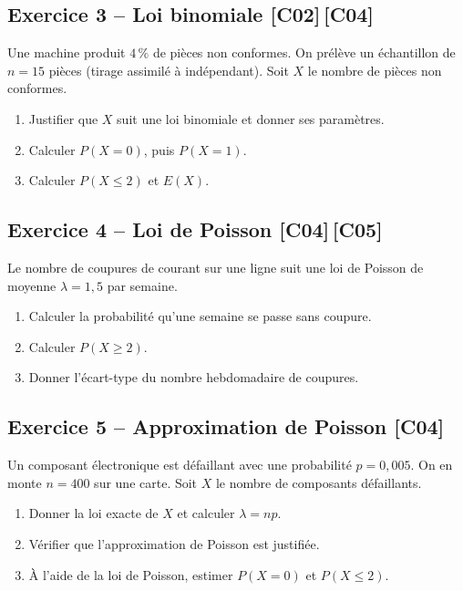 \documentclass[a4paper,11pt]{article}
\begin{document}
\subsection*{Exercice 3 -- Loi binomiale \hfill {\normalsize\color{uimmred}[C02]\,[C04]}}
Une machine produit $4\,\%$ de pièces non conformes. On prélève un échantillon de $n = 15$ pièces (tirage assimilé à indépendant). Soit $X$ le nombre de pièces non conformes.
\begin{enumerate}[label=\alph*)]
  \item Justifier que $X$ suit une loi binomiale et donner ses paramètres.
  \item Calculer $P(X = 0)$, puis $P(X = 1)$.
  \item Calculer $P(X \leq 2)$ et $E(X)$.
\end{enumerate}

\subsection*{Exercice 4 -- Loi de Poisson \hfill {\normalsize\color{uimmred}[C04]\,[C05]}}
Le nombre de coupures de courant sur une ligne suit une loi de Poisson de moyenne $\lambda = 1{,}5$ par semaine.
\begin{enumerate}[label=\alph*)]
  \item Calculer la probabilité qu'une semaine se passe sans coupure.
  \item Calculer $P(X \geq 2)$.
  \item Donner l'écart-type du nombre hebdomadaire de coupures.
\end{enumerate}

\subsection*{Exercice 5 -- Approximation de Poisson \hfill {\normalsize\color{uimmred}[C04]}}
Un composant électronique est défaillant avec une probabilité $p = 0{,}005$. On en monte $n = 400$ sur une carte. Soit $X$ le nombre de composants défaillants.
\begin{enumerate}[label=\alph*)]
  \item Donner la loi exacte de $X$ et calculer $\lambda = np$.
  \item Vérifier que l'approximation de Poisson est justifiée.
  \item À l'aide de la loi de Poisson, estimer $P(X = 0)$ et $P(X \leq 2)$.
\end{enumerate}
\end{document}
